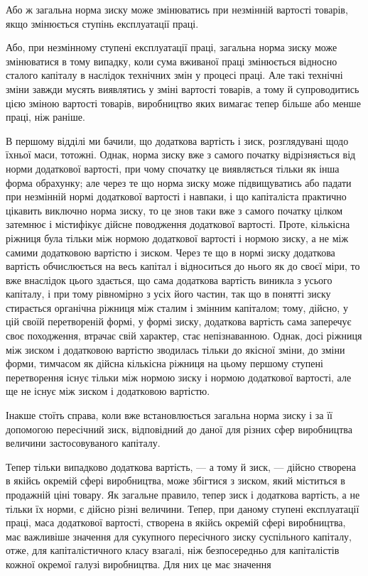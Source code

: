 
Або ж загальна норма зиску може змінюватись при незмінній вартості товарів, якщо змінюється ступінь
експлуатації праці.

Або, при незмінному ступені експлуатації праці, загальна
норма зиску може змінюватися в тому випадку, коли сума вживаної праці змінюється відносно сталого
капіталу в наслідок
технічних змін у процесі праці. Але такі технічні зміни завжди
мусять виявлятись у зміні вартості товарів, а тому й супроводитись цією зміною вартості товарів,
виробництво яких вимагає
тепер більше або менше праці, ніж раніше.

В першому відділі ми бачили, що додаткова вартість і зиск,
розглядувані щодо їхньої маси, тотожні. Однак, норма зиску вже
з самого початку відрізняється від норми додаткової вартості,
при чому спочатку це виявляється тільки як інша форма обрахунку; але через те що норма зиску може
підвищуватись або
падати при незмінній нормі додаткової вартості і навпаки, і що
капіталіста практично цікавить виключно норма зиску, то це
знов таки вже з самого початку цілком затемнює і містифікує
дійсне поводження додаткової вартості. Проте, кількісна ріжниця
була тільки між нормою додаткової вартості і нормою зиску,
а не між самими додатковою вартістю і зиском. Через те що
в нормі зиску додаткова вартість обчислюється на весь капітал
і відноситься до нього як до своєї міри, то вже внаслідок
цього здається, що сама додаткова вартість виникла з усього
капіталу, і при тому рівномірно з усіх його частин, так що
в понятті зиску стирається органічна ріжниця між сталим і змінним капіталом; тому, дійсно, у цій
своїй перетвореній формі,
у формі зиску, додаткова вартість сама заперечує своє походження, втрачає свій характер, стає
непізнаванною. Однак, досі
ріжниця між зиском і додатковою вартістю зводилась тільки до
якісної зміни, до зміни форми, тимчасом як дійсна кількісна
ріжниця на цьому першому ступені перетворення існує тільки
між нормою зиску і нормою додаткової вартості, але ще не існує
між зиском і додатковою вартістю.

Інакше стоїть справа, коли вже встановлюється загальна
норма зиску і за її допомогою пересічний зиск, відповідний до
даної для різних сфер виробництва величини застосовуваного
капіталу.

Тепер тільки випадково додаткова вартість, — а тому й зиск, — дійсно створена в якійсь окремій сфері
виробництва, може збігтися з зиском, який міститься в продажній ціні товару. Як загальне правило,
тепер зиск і додаткова вартість, а не тільки їх
норми, є дійсно різні величини. Тепер, при даному ступені
експлуатації праці, маса додаткової вартості, створена в якійсь
окремій сфері виробництва, має важливіше значення для сукупного пересічного зиску суспільного
капіталу, отже, для капіталістичного класу взагалі, ніж безпосередньо для капіталістів кожної
окремої галузі виробництва. Для них це має значення
\parbreak{}  %
